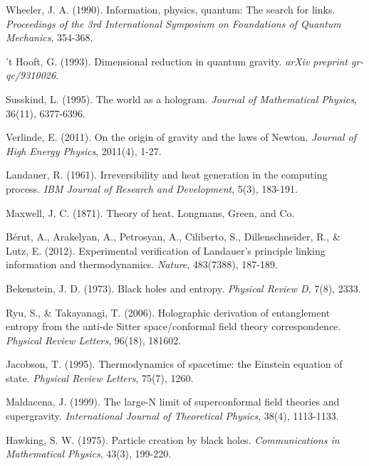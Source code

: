 \documentclass[11pt,a4paper]{article}
\theoremstyle{plain}
\theoremstyle{definition}
\theoremstyle{remark}
\begin{document}
\begin{thebibliography}{99}

Wheeler, J. A. (1990). Information, physics, quantum: The search for links. \textit{Proceedings of the 3rd International Symposium on Foundations of Quantum Mechanics}, 354-368.

't Hooft, G. (1993). Dimensional reduction in quantum gravity. \textit{arXiv preprint gr-qc/9310026}.

Susskind, L. (1995). The world as a hologram. \textit{Journal of Mathematical Physics}, 36(11), 6377-6396.

Verlinde, E. (2011). On the origin of gravity and the laws of Newton. \textit{Journal of High Energy Physics}, 2011(4), 1-27.

Landauer, R. (1961). Irreversibility and heat generation in the computing process. \textit{IBM Journal of Research and Development}, 5(3), 183-191.

Maxwell, J. C. (1871). Theory of heat. Longmans, Green, and Co.

Bérut, A., Arakelyan, A., Petrosyan, A., Ciliberto, S., Dillenschneider, R., \& Lutz, E. (2012). Experimental verification of Landauer's principle linking information and thermodynamics. \textit{Nature}, 483(7388), 187-189.

Bekenstein, J. D. (1973). Black holes and entropy. \textit{Physical Review D}, 7(8), 2333.

Ryu, S., \& Takayanagi, T. (2006). Holographic derivation of entanglement entropy from the anti-de Sitter space/conformal field theory correspondence. \textit{Physical Review Letters}, 96(18), 181602.

Jacobson, T. (1995). Thermodynamics of spacetime: the Einstein equation of state. \textit{Physical Review Letters}, 75(7), 1260.

Maldacena, J. (1999). The large-N limit of superconformal field theories and supergravity. \textit{International Journal of Theoretical Physics}, 38(4), 1113-1133.

Hawking, S. W. (1975). Particle creation by black holes. \textit{Communications in Mathematical Physics}, 43(3), 199-220.


\end{thebibliography}
\end{document}
